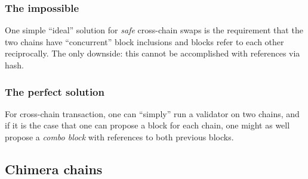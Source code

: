 \documentclass{article}
\theoremstyle{definition}
\begin{document}
\subsubsection{The impossible}
\label{sec:impossible-concurrency}

One simple 
``ideal'' solution for \emph{safe}
cross-chain swaps is the requirement that
the two chains have
``concurrent'' block inclusions
and blocks refer to each other reciprocally.
The only downside:
this cannot be accomplished with references via hash.

\subsubsection{The perfect solution}
\label{sec:perfect}

For cross-chain transaction,
one can “simply” run a validator on two chains,
and if it is the case that one 
can propose a block for each chain, 
one might as well propose a \emph{combo block}  
with references to both previous blocks.
















\subsection{Chimera chains}
\label{sec:chimera-chains}
\end{document}
